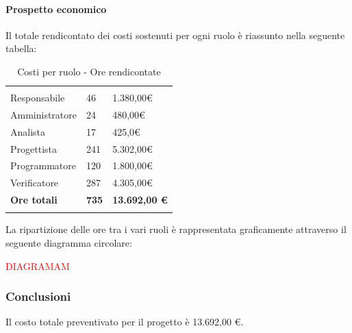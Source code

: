 			\paragraph{Prospetto economico} \Spazio
			Il totale rendicontato dei costi sostenuti per ogni ruolo è riassunto nella seguente tabella:
			\begin{table}[H]
				\centering
				\begin{tabular}{|p{4cm}|C{4cm}|C{4cm}|}
					
					 & &\\
					Responsabile & 46 & 1.380,00\euro \\
					\hline
					Amministratore& 24 & 480,00\euro \\
					\hline
					Analista & 17 & 425,0\euro \\
					\hline
					Progettista & 241 & 5.302,00\euro \\
					\hline
					Programmatore & 120 & 1.800,00\euro \\
					\hline
					Verificatore & 287 & 4.305,00\euro \\
					\hline
					\textbf{Ore totali} & \textbf{735} & \textbf{13.692,00 \euro} \\
				\end{tabular}
				\caption{Costi per ruolo - Ore rendicontate}
			\end{table}
		
			La ripartizione delle ore tra i vari ruoli è rappresentata graficamente attraverso il seguente diagramma circolare:
		
			\textcolor{red}{DIAGRAMAM}
		
			
			\subsubsection{Conclusioni}
			
			Il costo totale preventivato per il progetto è 13.692,00 \euro.
